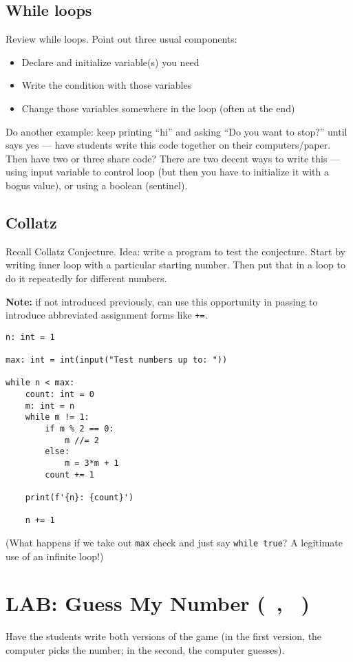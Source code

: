 \documentclass{article}
\newcommand{\shortmonthname}{\StrLeft{\datemonthname}{3}}
\newcommand{\showdate}{\thedateday\ \shortmonthname}
\newcommand{\lab}[1]{\section*{LAB: #1 (\showdate\nextdate, \showdate)}}
\begin{document}
\subsection*{While loops}

Review while loops. Point out three usual components:
\begin{itemize}
\item Declare and initialize variable(s) you need
\item Write the condition with those variables
\item Change those variables somewhere in the loop (often at the
  end)
\end{itemize}

Do another example: keep printing ``hi'' and asking ``Do you want to
stop?'' until says yes --- have students write this code together on
their computers/paper.  Then have two or three share code?  There are
two decent ways to write this --- using input variable to control loop
(but then you have to initialize it with a bogus value), or using a
boolean (sentinel).

\subsection*{Collatz}

Recall Collatz Conjecture.  Idea: write a program to test the
conjecture.  Start by writing inner loop with a particular starting
number.  Then put that in a loop to do it repeatedly for different
numbers.

\textbf{Note:} if not introduced previously, can use this opportunity
in passing to introduce abbreviated assignment forms like \verb|+=|.

\begin{verbatim}
n: int = 1

max: int = int(input("Test numbers up to: "))

while n < max:
    count: int = 0
    m: int = n
    while m != 1:
        if m % 2 == 0:
            m //= 2
        else:
            m = 3*m + 1
        count += 1

    print(f'{n}: {count}')

    n += 1
\end{verbatim}

(What happens if we take out \verb|max| check and just say
\verb|while true|?  A legitimate use of an infinite loop!)

\newpage
\lab{Guess My Number}

Have the students write both versions of the game (in the first
version, the computer picks the number; in the second, the computer
guesses).
\end{document}
